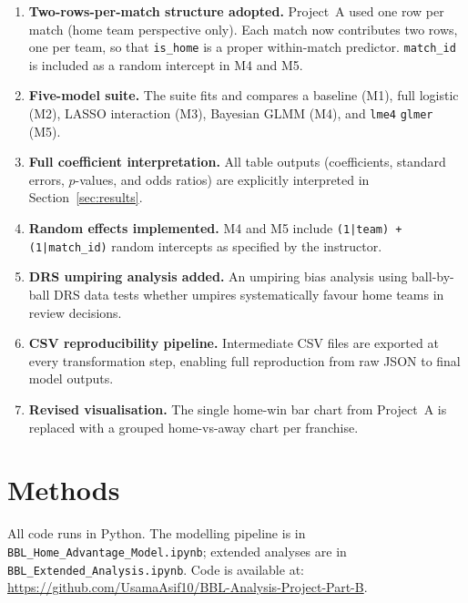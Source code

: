 \documentclass[12pt,a4paper]{article}
\begin{document}
\begin{enumerate}
  \item \textbf{Two-rows-per-match structure adopted.} Project~A used one row per match (home
    team perspective only). Each match now contributes two rows, one per team, so that
    \texttt{is\_home} is a proper within-match predictor. \texttt{match\_id} is included as
    a random intercept in M4 and M5.

  \item \textbf{Five-model suite.} The suite fits and compares a baseline (M1), full logistic
    (M2), LASSO interaction (M3), Bayesian GLMM (M4), and \texttt{lme4} \texttt{glmer} (M5).

  \item \textbf{Full coefficient interpretation.} All table outputs (coefficients, standard
    errors, $p$-values, and odds ratios) are explicitly interpreted in
    Section~\ref{sec:results}.

  \item \textbf{Random effects implemented.} M4 and M5 include
    \texttt{(1|team) + (1|match\_id)} random intercepts as specified by the instructor.

  \item \textbf{DRS umpiring analysis added.} An umpiring bias analysis using ball-by-ball DRS
    data tests whether umpires systematically favour home teams in review decisions.

  \item \textbf{CSV reproducibility pipeline.} Intermediate CSV files are exported at every
    transformation step, enabling full reproduction from raw JSON to final model outputs.

  \item \textbf{Revised visualisation.} The single home-win bar chart from Project~A is
    replaced with a grouped home-vs-away chart per franchise.
\end{enumerate}

\section{Methods}

All code runs in Python. The modelling pipeline is in \texttt{BBL\_Home\_Advantage\_Model.ipynb};
extended analyses are in \texttt{BBL\_Extended\_Analysis.ipynb}. Code is available at:
\url{https://github.com/UsamaAsif10/BBL-Analysis-Project-Part-B}.
\end{document}
